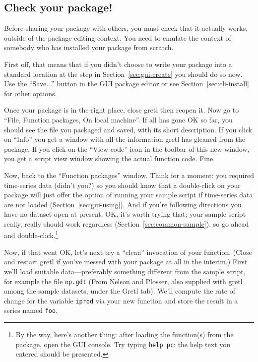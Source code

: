 \documentclass[oneside]{book}
\begin{document}
\subsection{Check your package!}

Before sharing your package with others, you must check that it
actually works, outside of the package-editing context. You need to
emulate the context of somebody who has installed your package from
scratch.

First off, that means that if you didn't choose to write your package
into a standard location at the step in Section~\ref{sec:gui-create}
you should do so now. Use the ``Save...'' button in the GUI package
editor or see Section~\ref{sec:cli-install} for other options.

Once your package is in the right place, close gretl then reopen it.
Now go to ``File, Function packages, On local machine''. If all has
gone OK so far, you should see the file you packaged and saved, with
its short description.  If you click on ``Info'' you get a window with
all the information gretl has gleaned from the package.  If you click
on the ``View code'' icon in the toolbar of this new window, you get a
script view window showing the actual function code. Fine.

Now, back to the ``Function packages'' window. Think for a moment: you
required time-series data (didn't you?) so you should know that a
double-click on your package will just offer the option of running
your sample script if time-series data are not loaded
(Section~\ref{sec:gui-using}). And if you're following directions you
have no dataset open at present. OK, it's worth trying that; your
sample script really, really should work regardless
(Section~\ref{sec:common-sample}), so go ahead and
double-click.\footnote{By the way, here's another thing: after loading
  the function(s) from the package, open the GUI console. Try typing
  \texttt{help pc}: the help text you entered should be presented.}

Now, if that went OK, let's next try a ``clean'' invocation of your
function. (Close and restart gretl if you've messed with your package
at all in the interim.)  First we'll load suitable data---preferably
something different from the sample script, for example the file
\texttt{np.gdt} (From Nelson and Plosser, also supplied with gretl
among the sample datasets, under the \textsf{Gretl} tab). We'll
compute the rate of change for the variable \texttt{iprod} via your
new function and store the result in a series named \texttt{foo}.
\end{document}
